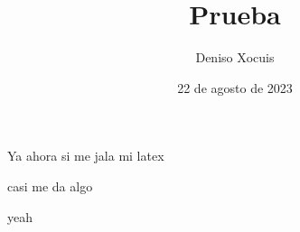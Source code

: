 \documentclass[letterpaper,12pt]{article}
\title {\textbf{Prueba}}
\author{Deniso Xocuis}
\date{22 de agosto de 2023}
\begin{document}
\maketitle

\begin{sloppypar}
Ya ahora si me jala mi latex

casi me da algo

yeah


\end{sloppypar}
\end{document}
